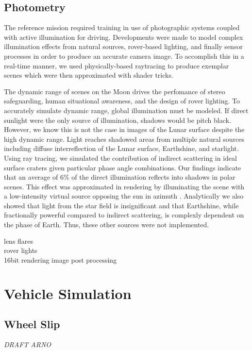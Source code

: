 \documentclass[twocolumn,letterpaper]{IEEEAerospaceCLS}  %
\begin{document}
\subsection {Photometry}
The reference mission required training in use of photographic systems coupled with active illumination for driving. Developments were made to model complex illumination effects from natural sources, rover-based lighting, and finally sensor processes in order to produce an accurate camera image. To accomplish this in a real-time manner, we used physically-based raytracing to produce exemplar scenes which were then approximated with shader tricks. 

The dynamic range of scenes on the Moon drives the perfomance of stereo safeguarding, human situational awareness, and the design of rover lighting. To accurately simulate dynamic range, global illumination must be modeled. If direct sunlight were the only source of illumination, shadows would be pitch black. However, we know this is not the case in images of the Lunar surface despite the high dynamic range. Light reaches shadowed areas from multiple natural sources including diffuse interreflection of the Lunar surface, Earthshine, and starlight. Using ray tracing, we simulated the contribution of indirect scattering in ideal surface craters given particular phase angle combinations. Our findings indicate that an average of 6\% of the direct illumination reflects into shadows in polar scenes. This effect was approximated in rendering by illuminating the scene with a low-intensity virtual source opposing the sun in azimuth . Analytically we also showed that light from the star field is insignificant and that Earthshine, while fractionally powerful compared to indirect scattering, is complexly dependent on the phase of Earth. Thus, these other sources were not implemented.       

lens flares\\
rover lights\\
16bit rendering image post processing\\



\section{Vehicle Simulation}


\subsection{Wheel Slip}
\textit{DRAFT ARNO}
\end{document}
